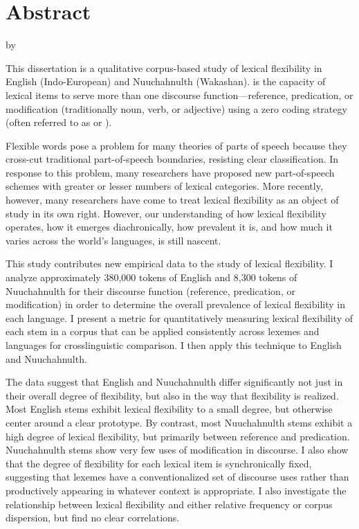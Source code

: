 \clearpage
{}
\section*{Abstract}
\label{sec:abstract}

\begin{center}

  \doctitle

  by

  \theauthor

\end{center}

This dissertation is a qualitative corpus-based study of lexical flexibility in English (Indo-European) and Nuuchahnulth (Wakashan).  is the capacity of lexical items to serve more than one discourse function—reference, predication, or modification (traditionally noun, verb, or adjective) using a zero coding strategy (often referred to as  or ).

Flexible words pose a problem for many theories of parts of speech because they cross-cut traditional part-of-speech boundaries, resisting clear classification. In response to this problem, many researchers have proposed new part-of-speech schemes with greater or lesser numbers of lexical categories. More recently, however, many researchers have come to treat lexical flexibility as an object of study in its own right. However, our understanding of how lexical flexibility operates, how it emerges diachronically, how prevalent it is, and how much it varies across the world's languages, is still nascent.

This study contributes new empirical data to the study of lexical flexibility. I analyze approximately 380,000 tokens of English and 8,300 tokens of Nuuchahnulth for their discourse function (reference, predication, or modification) in order to determine the overall prevalence of lexical flexibility in each language. I present a metric for quantitatively measuring lexical flexibility of each stem in a corpus that can be applied consistently across lexemes and languages for crosslinguistic comparison. I then apply this technique to English and Nuuchahnulth.

The data suggest that English and Nuuchahnulth differ significantly not just in their overall degree of flexibility, but also in the way that flexibility is realized. Most English stems exhibit lexical flexibility to a small degree, but otherwise center around a clear prototype. By contrast, most Nuuchahnulth stems exhibit a high degree of lexical flexibility, but primarily between reference and predication. Nuuchahnulth stems show very few uses of modification in discourse. I also show that the degree of flexibility for each lexical item is synchronically fixed, suggesting that lexemes have a conventionalized set of discourse uses rather than productively appearing in whatever context is appropriate. I also investigate the relationship between lexical flexibility and either relative frequency or corpus dispersion, but find no clear correlations.

